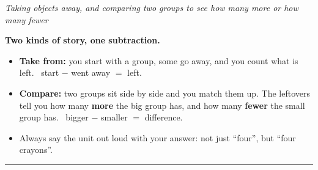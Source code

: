 \documentclass[12pt]{article}
\begin{document}

\begin{center}\small\textit{Taking objects away, and comparing two groups to see
how many more or how many fewer}\end{center}

\noindent\textbf{Two kinds of story, one subtraction.}
\begin{itemize}[leftmargin=0.9cm, itemsep=1pt, topsep=2pt]
  \item \textbf{Take from:} you start with a group, some go away, and you count
        what is left. \ start $-$ went away $=$ left.
  \item \textbf{Compare:} two groups sit side by side and you match them up.
        The leftovers tell you how many \textbf{more} the big group has, and how
        many \textbf{fewer} the small group has. \ bigger $-$ smaller $=$ difference.
  \item Always say the unit out loud with your answer: not just ``four'', but
        ``four crayons''.
\end{itemize}
\noindent\rule{\linewidth}{0.4pt}


\end{document}
